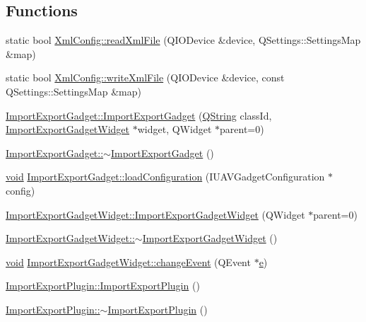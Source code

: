 \subsection*{\-Functions}
\begin{DoxyCompactItemize}
\item 
static bool \hyperlink{group__importexportplugin_gaaac43e2b7105e05bbc6c996a6d1e7944}{\-Xml\-Config\-::read\-Xml\-File} (\-Q\-I\-O\-Device \&device, \-Q\-Settings\-::\-Settings\-Map \&map)
\item 
static bool \hyperlink{group__importexportplugin_ga2e9b6064b59c93e1c7bebdce1a672d68}{\-Xml\-Config\-::write\-Xml\-File} (\-Q\-I\-O\-Device \&device, const \-Q\-Settings\-::\-Settings\-Map \&map)
\item 
\hyperlink{group__importexportplugin_ga449e9c18b4cda73ccd909194aa3485e5}{\-Import\-Export\-Gadget\-::\-Import\-Export\-Gadget} (\hyperlink{group___u_a_v_objects_plugin_gab9d252f49c333c94a72f97ce3105a32d}{\-Q\-String} class\-Id, \hyperlink{class_import_export_gadget_widget}{\-Import\-Export\-Gadget\-Widget} $\ast$widget, \-Q\-Widget $\ast$parent=0)
\item 
\hyperlink{group__importexportplugin_ga43425e89a61490abd203a67eb51a61e0}{\-Import\-Export\-Gadget\-::$\sim$\-Import\-Export\-Gadget} ()
\item 
\hyperlink{group___u_a_v_objects_plugin_ga444cf2ff3f0ecbe028adce838d373f5c}{void} \hyperlink{group__importexportplugin_gaffb56b3fb88f123af21ac597a514345a}{\-Import\-Export\-Gadget\-::load\-Configuration} (\-I\-U\-A\-V\-Gadget\-Configuration $\ast$config)
\item 
\hyperlink{group__importexportplugin_gaa6f8e207b497782f1c00bebfcdf362e6}{\-Import\-Export\-Gadget\-Widget\-::\-Import\-Export\-Gadget\-Widget} (\-Q\-Widget $\ast$parent=0)
\item 
\hyperlink{group__importexportplugin_ga96b1b166720e190f43ce5a83b0440ba8}{\-Import\-Export\-Gadget\-Widget\-::$\sim$\-Import\-Export\-Gadget\-Widget} ()
\item 
\hyperlink{group___u_a_v_objects_plugin_ga444cf2ff3f0ecbe028adce838d373f5c}{void} \hyperlink{group__importexportplugin_gac24ae66f22b367d4a3854a11092b6732}{\-Import\-Export\-Gadget\-Widget\-::change\-Event} (\-Q\-Event $\ast$\hyperlink{_o_p_plots_8m_a9425be9aab51621e317ba7ade564b570}{e})
\item 
\hyperlink{group__importexportplugin_ga925c9f27737044548e1b28010361c41b}{\-Import\-Export\-Plugin\-::\-Import\-Export\-Plugin} ()
\item 
\hyperlink{group__importexportplugin_gaf5eae178665a2798a8172dd3a45ff9af}{\-Import\-Export\-Plugin\-::$\sim$\-Import\-Export\-Plugin} ()

\end{DoxyCompactItemize}
